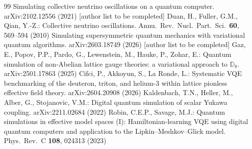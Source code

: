 \documentclass[pdflatex,sn-mathphys-num]{sn-jnl}
\begin{document}
\begin{thebibliography}{99}
 Simulating collective neutrino oscillations on a quantum computer. arXiv:2102.12556 (2021) [author list to be completed]
 Duan, H., Fuller, G.M., Qian, Y.-Z.: Collective neutrino oscillations. Annu.\ Rev.\ Nucl.\ Part.\ Sci.\ \textbf{60}, 569--594 (2010)
 Simulating supersymmetric quantum mechanics with variational quantum algorithms. arXiv:2603.18749 (2026) [author list to be completed]
 Gaz, E., Popov, P.P., Pardo, G., Lewenstein, M., Hauke, P., Zohar, E.: Quantum simulation of non-Abelian lattice gauge theories: a variational approach to $\mathbb{D}_8$. arXiv:2501.17863 (2025)
 Cifci, P., Akkoyun, S., La Ronde, L.: Systematic VQE benchmarking of the deuteron, triton, and helium-3 within lattice pionless effective field theory. arXiv:2604.20908 (2026)
 Kaldenbach, T.N., Heller, M., Alber, G., Stojanovic, V.M.: Digital quantum simulation of scalar Yukawa coupling. arXiv:2211.02684 (2022)
 Robin, C.E.P., Savage, M.J.: Quantum simulations in effective model spaces (I): Hamiltonian-learning VQE using digital quantum computers and application to the Lipkin--Meshkov--Glick model. Phys.\ Rev.\ C \textbf{108}, 024313 (2023)
\end{thebibliography}
\end{document}
